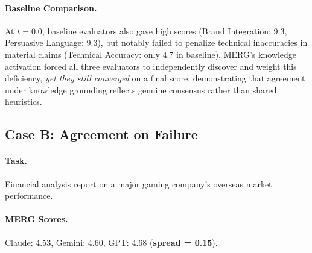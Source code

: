 \documentclass{article}
\begin{document}
\paragraph{Baseline Comparison.} At $t{=}0.0$, baseline evaluators also gave high scores (Brand Integration: 9.3, Persuasive Language: 9.3), but notably failed to penalize technical inaccuracies in material claims (Technical Accuracy: only 4.7 in baseline). MERG's knowledge activation forced all three evaluators to independently discover and weight this deficiency, \textit{yet they still converged} on a final score, demonstrating that agreement under knowledge grounding reflects genuine consensus rather than shared heuristics.

\subsection{Case B: Agreement on Failure}
\label{case:agreement_failure}

\paragraph{Task.} Financial analysis report on a major gaming company's overseas market performance.

\paragraph{MERG Scores.} Claude: 4.53, Gemini: 4.60, GPT: 4.68 (\textbf{spread = 0.15}).
\end{document}
